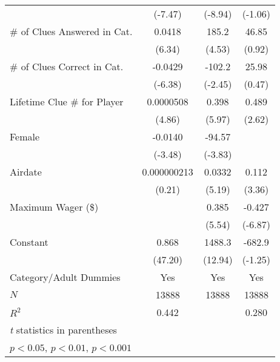 \begin{table}[htbp]
\begin{tabular}{l*{3}{c}}
            &     (-7.47)         &     (-8.94)         &     (-1.06)         \\
\# of Clues Answered in Cat.&      0.0418\sym{***}&       185.2\sym{***}&       46.85         \\
            &      (6.34)         &      (4.53)         &      (0.92)         \\
\# of Clues Correct in Cat.&     -0.0429\sym{***}&      -102.2\sym{*}  &       25.98         \\
            &     (-6.38)         &     (-2.45)         &      (0.47)         \\
Lifetime Clue \# for Player&   0.0000508\sym{***}&       0.398\sym{***}&       0.489\sym{**} \\
            &      (4.86)         &      (5.97)         &      (2.62)         \\
Female      &     -0.0140\sym{***}&      -94.57\sym{***}&                     \\
            &     (-3.48)         &     (-3.83)         &                     \\
Airdate     & 0.000000213         &      0.0332\sym{***}&       0.112\sym{***}\\
            &      (0.21)         &      (5.19)         &      (3.36)         \\
Maximum Wager (\$)&                     &       0.385\sym{***}&      -0.427\sym{***}\\
            &                     &      (5.54)         &     (-6.87)         \\
Constant    &       0.868\sym{***}&      1488.3\sym{***}&      -682.9         \\
            &     (47.20)         &     (12.94)         &     (-1.25)         \\
Category/Adult Dummies &         Yes         &         Yes         &         Yes         \\
\hline
\(N\)       &       13888         &       13888         &       13888         \\
\(R^{2}\)   &       0.442         &                     &       0.280         \\
\hline\hline
\multicolumn{4}{l}{\footnotesize \textit{t} statistics in parentheses}\\
\multicolumn{4}{l}{\footnotesize \sym{*} \(p<0.05\), \sym{**} \(p<0.01\), \sym{***} \(p<0.001\)}\\
\end{tabular}
\end{table}
